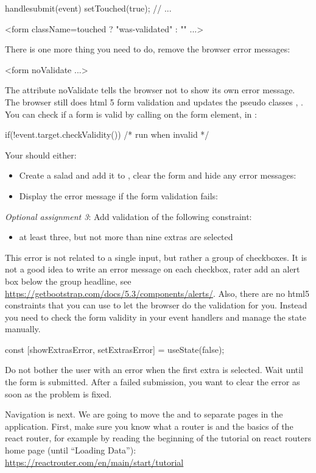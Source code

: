 \documentclass[fleqn, article, a4paper]{memoir}
\begin{document}
\begin{Assignments}
\begin{Code}
handlesubmit(event) {
  setTouched(true);
  // ...
}

<form className={touched ? "was-validated" : ""} ...>
\end{Code}
There is one more thing you need to do, remove the browser error messages:
\begin{Code}
<form noValidate ...>
\end{Code}
The attribute noValidate tells the browser not to show its own error message. The browser still does html 5 form validation and updates the pseudo classes , . You can check if a form is valid by calling  on the form element, in :
\begin{Code}
if(!event.target.checkValidity()){ /* run when invalid */ }
\end{Code}

\noindent Your  should either:
\begin{itemize}
  \item Create a salad and add it to , clear the form and hide any error messages: 
  \item Display the error message if the form validation fails: 
\end{itemize}

\item \emph{Optional assignment 3}: Add validation of the following constraint:
\begin{itemize}
  \item at least three, but not more than nine extras are selected
\end{itemize}
This error is not related to a single input, but rather a group of checkboxes. It is not a good idea to write an error message on each checkbox, rater add an alert box below the group headline, see \url{https://getbootstrap.com/docs/5.3/components/alerts/}. Also, there are no html5 constraints that you can use to let the browser do the validation for you. Instead you need to check the form validity in your event handlers and manage the state manually.
\begin{Code}
const [showExtrasError, setExtrasError] = useState(false);
\end{Code}
Do not bother the user with an error when the first extra is selected. Wait until the form is submitted. After a failed submission, you want to clear the error as soon as the problem is fixed.

\item Navigation is next. We are going to move the  and  to separate pages in the application. First, make sure you know what a router is and the basics of the react router, for example by reading the beginning of the tutorial on react routers home page (until ``Loading Data''): 
\\ \url{https://reactrouter.com/en/main/start/tutorial}


\end{Assignments}
\end{document}

